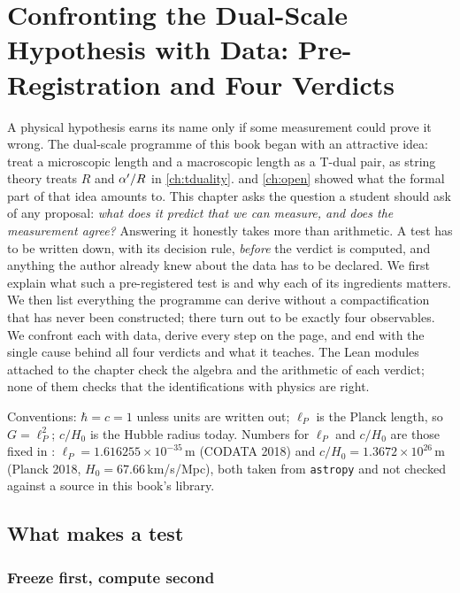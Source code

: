 \chapter{Confronting the Dual-Scale Hypothesis with Data: Pre-Registration and Four Verdicts}\label{ch:verdicts}

A physical hypothesis earns its name only if some measurement could prove it wrong. The
dual-scale programme of this book began with an attractive idea: treat a microscopic length and
a macroscopic length as a T-dual pair, as string theory treats $R$ and $\alpha'/R$ in
\cref{ch:tduality}.  and \cref{ch:open} showed what the formal part of that
idea amounts to. This chapter asks the question a student should ask of any proposal: \emph{what
does it predict that we can measure, and does the measurement agree?} Answering it honestly
takes more than arithmetic. A test has to be written down, with its decision rule, \emph{before}
the verdict is computed, and anything the author already knew about the data has to be
declared. We first explain what such a pre-registered test is and why each of its ingredients
matters. We then list everything the programme can derive without a compactification that has
never been constructed; there turn out to be exactly four observables. We confront each with
data, derive every step on the page, and end with the single cause behind all four verdicts and
what it teaches. The Lean modules attached to the chapter check the algebra and the arithmetic
of each verdict; none of them checks that the identifications with physics are right.

Conventions: $\hbar=c=1$ unless units are written out; $\ell_P$ is the Planck length, so
$G=\ell_P^2$; $c/H_0$ is the Hubble radius today. Numbers for $\ell_P$ and $c/H_0$ are those
fixed in :
$\ell_P=1.616255\times10^{-35}$\,m (CODATA 2018) and $c/H_0=1.3672\times10^{26}$\,m (Planck 2018,
$H_0=67.66$\,km/s/Mpc), both taken from \texttt{astropy} and not checked against a source in
this book's library.

\section{What makes a test}\label{sec:verdicts:test}

\subsection{Freeze first, compute second}

